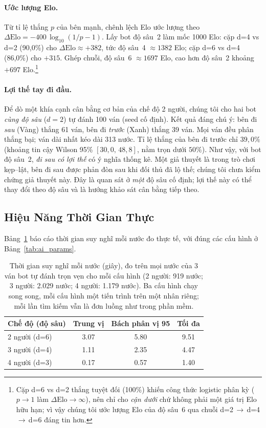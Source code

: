 \paragraph{Ước lượng Elo.}
Từ tỉ lệ thắng $p$ của bên mạnh, chênh lệch Elo ước lượng theo
$\Delta\mathrm{Elo} = -400\,\log_{10}(1/p - 1)$. Lấy bot độ sâu~2 làm
mốc 1000 Elo: cặp d=4 vs d=2 (90{,}0\%) cho $\Delta\mathrm{Elo}\approx{+}382$,
tức độ sâu~4 $\approx 1382$ Elo; cặp d=6 vs d=4 (86{,}0\%) cho ${+}315$.
Ghép chuỗi, độ sâu~6 $\approx 1697$ Elo, cao hơn độ sâu~2 khoảng
${+}697$ Elo.\footnote{Cặp d=6 vs d=2 thắng tuyệt đối
(100\%) khiến công thức logistic phân kỳ ($p\to1$ làm
$\Delta\mathrm{Elo}\to\infty$), nên chỉ cho \emph{cận dưới} chứ không phải
một giá trị Elo hữu hạn; vì vậy chúng tôi ước lượng Elo của độ sâu~6 qua
chuỗi d=2\,$\to$\,d=4\,$\to$\,d=6 đáng tin hơn.}

\paragraph{Lợi thế tay đi đầu.}
Để dò một khía cạnh cân bằng cơ bản của chế độ 2 người, chúng tôi cho hai
bot \emph{cùng độ sâu} ($d{=}2$) tự đánh 100 ván (seed cố định). Kết quả
đáng chú ý: bên đi \emph{sau} (Vàng) thắng 61 ván, bên đi \emph{trước}
(Xanh) thắng 39 ván. Mọi ván đều phân thắng bại; ván dài nhất kéo dài 313
nước. Tỉ lệ thắng của bên đi trước chỉ $39{,}0\%$ (khoảng tin cậy Wilson
95\% $[30{,}0,\,48{,}8]$, nằm trọn dưới $50\%$). Như vậy, với bot độ sâu~2, \emph{đi sau có lợi
thế} có ý nghĩa thống kê. Một giả thuyết là trong trò chơi kẹp--lật, bên đi
sau được phản đòn sau khi đối thủ đã lộ thế; chúng tôi chưa kiểm chứng giả
thuyết này. Đây
là quan sát ở \emph{một} độ sâu cố định; lợi thế này có thể thay đổi theo
độ sâu và là hướng khảo sát cân bằng tiếp theo.

\subsection{Hiệu Năng Thời Gian Thực}
\label{sec:eval_timing}

Bảng~\ref{tab:timing} báo cáo thời gian suy nghĩ mỗi nước đo thực tế,
với đúng các cấu hình ở Bảng~\ref{tab:ai_params}.

\begin{table}[H]
  \centering
  \caption{Thời gian suy nghĩ mỗi nước (giây), đo trên mọi nước của 3 ván
  bot tự đánh trọn vẹn cho mỗi cấu hình (2 người: 919 nước; 3 người: 2.029
  nước; 4 người: 1.179 nước). Ba cấu hình chạy song song, mỗi cấu hình một
  tiến trình trên một nhân riêng; mỗi lần tìm kiếm vẫn là đơn luồng như trong
  phần mềm.}
  \label{tab:timing}
  \begin{tabular}{lccc}
    \toprule
    \textbf{Chế độ (độ sâu)} & \textbf{Trung vị} & \textbf{Bách phân vị 95}
      & \textbf{Tối đa} \\
    \midrule
    2 người (d=6) & 3.07 & 5.80 & 9.51 \\
    3 người (d=4) & 1.11 & 2.35 & 4.47 \\
    4 người (d=3) & 0.17 & 0.57 & 1.40 \\
    \bottomrule
  \end{tabular}
\end{table}

